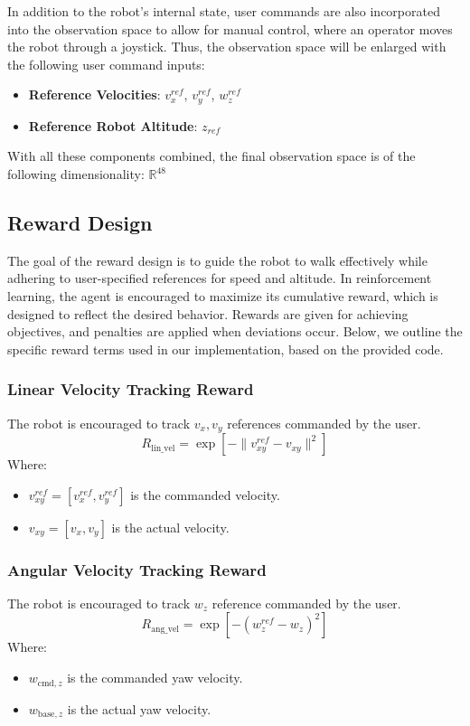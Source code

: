 In addition to the robot's internal state, user commands are also incorporated into the observation space to allow for manual control, where an operator moves the robot through a joystick. Thus, the observation space will be enlarged with the following user command inputs:
\begin{itemize}
	\item \textbf{Reference Velocities}: $v^{ref}_{x}$, $v^{ref}_{y}$, $w^{ref}_{z}$
	\item \textbf{Reference Robot Altitude}: $z_{ref}$
\end{itemize}
With all these components combined, the final observation space is of the following dimensionality: $\mathbb{R}^{48}$

\subsection{Reward Design}

The goal of the reward design is to guide the robot to walk effectively while adhering to user-specified references for speed and altitude. In reinforcement learning, the agent is encouraged to maximize its cumulative reward, which is designed to reflect the desired behavior. Rewards are given for achieving objectives, and penalties are applied when deviations occur. Below, we outline the specific reward terms used in our implementation, based on the provided code.

\subsubsection{Linear Velocity Tracking Reward}

The robot is encouraged to track $v_x, v_y$ references commanded by the user.
\[
R_{\text{lin\_vel}} = \exp\left[-\|v^{ref}_{xy} - v_{xy}\|^2\right]
\]
Where:
\begin{itemize}
	\item $v^{ref}_{xy} = [v^{ref}_{x}, v^{ref}_{y}]$ is the commanded velocity.
	\item $v_{xy} = [v_x, v_y]$ is the actual velocity.
\end{itemize}

\subsubsection{Angular Velocity Tracking Reward}

The robot is encouraged to track $w_z$ reference commanded by the user.
\[
R_{\text{ang\_vel}} = \exp\left[-(w^{ref}_{z} - w_{z})^2\right]
\]
Where:
\begin{itemize}
	\item $w_{\text{cmd},z}$ is the commanded yaw velocity.
	\item $w_{\text{base},z}$ is the actual yaw velocity.
\end{itemize}

